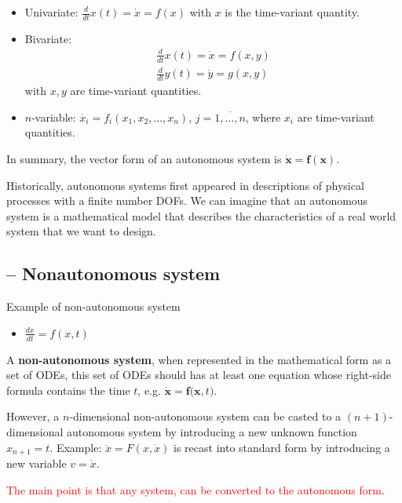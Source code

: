 \begin{itemize}
\item Univariate: $\frac{d}{dt}x(t) = \dot{x} = f(x)$ with $x$ is the
  time-variant quantity.

\item Bivariate: 
  \begin{equation}
    \label{eq:99}
    \begin{split}
      \frac{d}{dt}x(t) = \dot{x} = f(x,y) \\
      \frac{d}{dt}y(t) = \dot{y} = g(x,y)
    \end{split}
  \end{equation}
with $x,y$ are time-variant quantities.

\item $n$-variable: $\dot{x_i} = f_i(x_1,x_2,\dots,x_n)$,
  $j=\overline{1,\dots,n}$, where $x_i$ are time-variant quantities. 
\end{itemize}
In summary, the vector form of an autonomous system is
$\dot{\mathbf{x}}=\mathbf{f(x)}$. %

Historically, autonomous systems first appeared in descriptions of
physical processes with a finite number DOFs. We can imagine that an
autonomous system is a mathematical model that describes the
characteristics of a real world system that we want to design.

\subsection{-- Nonautonomous system}
\label{sec:nonautonomous-system}


Example of non-autonomous system
\begin{itemize}
\item $\frac{dx}{dt} = f(x,t)$
\end{itemize}

A {\bf non-autonomous system}, when represented in the mathematical
form as a set of ODEs, this set of ODEs should has at least one
equation whose right-side formula contains the time $t$, e.g.
$\dot{\mathbf{x}}=\mathbf{f(x},t)$. 


However, a $n$-dimensional
non-autonomous system can be casted to a $(n+1)$-dimensional
autonomous system by introducing a new unknown function $x_{n+1}=t$.
Example: $\ddot{x} = F(x,\dot{x})$ is recast into standard form by
introducing a new variable $v=\dot{x}$.

\textcolor{red}{The main point is that any system, can be converted to
  the autonomous form}.

